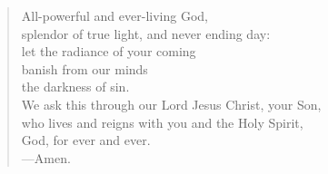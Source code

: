 \prayer

\setlength{\vleftmargin}{\prayerleftmargini}

\begin{verse}
All-powerful and ever-living God,\\
splendor of true light, and never ending day:\\
let the radiance of your coming\\
banish from our minds\\
the darkness of sin.\\
We ask this through our Lord Jesus Christ, your Son,\\
who lives and reigns with you and the Holy Spirit,\\
God, for ever and ever.\\
{\color{red}---\thinspace}Amen.
\end{verse}

\setlength{\vleftmargin}{\defleftmargini}